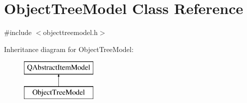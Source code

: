 \hypertarget{class_object_tree_model}{}\section{Object\+Tree\+Model Class Reference}
\label{class_object_tree_model}


{\ttfamily \#include $<$objecttreemodel.\+h$>$}

Inheritance diagram for Object\+Tree\+Model\+:\begin{figure}[H]
\begin{center}
\leavevmode
\includegraphics[height=2.000000cm]{df/da5/class_object_tree_model}
\end{center}
\end{figure}
